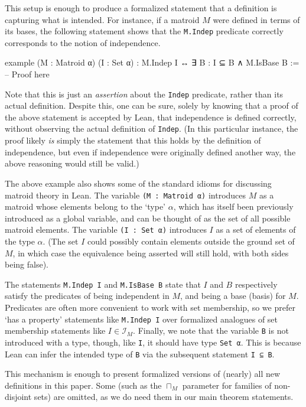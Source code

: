\documentclass{amsart}
\theoremstyle{plain}
\theoremstyle{definition}
\newcommand{\cI}{\mathcal{I}}
\newcommand{\smalltt}[1]{{\small\texttt{#1}}}
\begin{document}
This setup is enough to produce a formalized statement that a definition is
capturing what is intended. 
For instance, if a matroid $M$ were defined in terms of its bases, 
the following statement shows that the \smalltt{M.Indep} predicate correctly
corresponds to the notion of independence.  
\begin{leancode}
  example (M : Matroid α) (I : Set α) : 
    M.Indep I ↔ ∃ B : I ⊆ B ∧ M.IsBase B := 
    -- Proof here
\end{leancode}
Note that this is just an \textit{assertion} about the \smalltt{Indep} predicate, 
rather than its actual definition. 
Despite this, one can be sure,
solely by knowing that a proof of the above statement 
is accepted by Lean,
that independence is defined correctly,
without observing the actual definition of \smalltt{Indep}. 
(In this particular instance, the proof likely \emph{is}
simply the statement that this holds by the definition of independence, 
but even if independence were originally defined another way, 
the above reasoning would still be valid.)

The above example also shows some of the standard idioms for
discussing matroid theory in Lean. 
The variable \smalltt{(M : Matroid α)} introduces $M$
as a matroid whose elements belong to the `type' $\alpha$, 
which has itself been previously introduced as a global variable, 
and can be thought of as the set of all possible matroid elements. 
The variable \smalltt{(I : Set α)} introduces $I$ as a set of 
elements of the type $\alpha$. (The set $I$ could possibly contain 
elements outside the ground set of $M$, in which case 
the equivalence being asserted will still hold, with both sides being false). 

The statements \smalltt{M.Indep I} and \smalltt{M.IsBase B} 
state that $I$ and $B$ respectively satisfy the predicates of being 
independent in $M$, and being a base (basis) for $M$.
Predicates are often more convenient to work with set membership, 
so we prefer `has a property' statements like \smalltt{M.Indep I} over 
formalized analogues of set membership statements like $I \in \cI_M$. 
Finally, we note that the variable \smalltt{B} is not introduced 
with a type, though, like \smalltt{I}, it should have type \smalltt{Set α}. 
This is because Lean can infer the intended type of \smalltt{B}
via the subsequent statement \smalltt{I ⊆ B}.

This mechanism is enough to present formalized versions of (nearly) all 
new definitions in this paper. Some (such as the $\sqcap_M$ parameter 
for families of non-disjoint sets) are omitted, as we do need them in 
our main theorem statements. 
\end{document}
